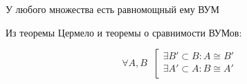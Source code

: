 
\begin{theorem}[Цермело]
    У любого множества есть равномощный ему ВУМ
\end{theorem}

Из теоремы Цермело и теоремы о сравнимости ВУМов:
\begin{corollary}
    \[\forall A, B\;\;\left[\begin{array}{l}
        \exists B' \subset B: A \cong B' \\
        \exists A' \subset A: B \cong A' \\
    \end{array}\right.\]
\end{corollary}